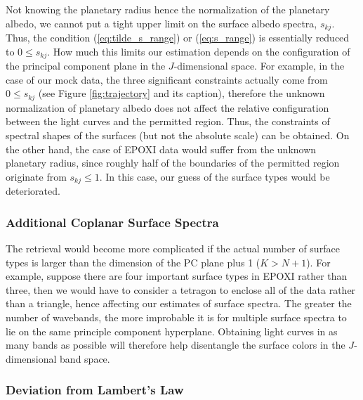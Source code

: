 \documentclass[iop,numberedappendix,apj]{emulateapj}
\def\memoYF#1{\color{red}[YF: {\bf #1}]\color{black}}
\begin{document}
Not knowing the planetary radius hence the normalization of the planetary albedo, we cannot put a tight upper limit on the surface albedo spectra, $s_{kj}$. 
Thus, the condition (\ref{eq:tilde_s_range}) or (\ref{eq:s_range}) is essentially  reduced to $0 \leq s_{kj}$. 
How much this limits our estimation depends on the configuration of the principal component plane in the $J$-dimensional space. 
For example, in the case of our mock data, the three significant constraints actually come from $0 \leq s_{kj}$ (see Figure \ref{fig:trajectory} and its caption), therefore the unknown normalization of planetary albedo does not affect the relative configuration between the light curves and the permitted region. 
Thus, the constraints of spectral shapes of the surfaces (but not the absolute scale) can be obtained. 
On the other hand, the case of EPOXI data would suffer from the unknown planetary radius, since roughly half of the boundaries of the permitted region originate from $ s_{kj} \leq 1$. 
In this case, our guess of the surface types would be deteriorated. 


\subsubsection{Additional Coplanar Surface Spectra}

The retrieval would become more complicated if the actual number of surface types is larger than the dimension of the PC plane plus 1 ($K > N + 1 $). 
For example, suppose there are four important surface types in EPOXI rather than three, then we would have to consider a tetragon to enclose all of the data rather than a triangle, hence affecting our estimates of surface spectra. 
The greater the number of wavebands, the more improbable it is for multiple surface spectra to lie on the same principle component hyperplane. 
Obtaining light curves in as many bands as possible will therefore help disentangle the surface colors in the $J$-dimensional band space. 


\subsubsection{Deviation from Lambert's Law}
\label{ss:deviate_Lambert}
\end{document}
